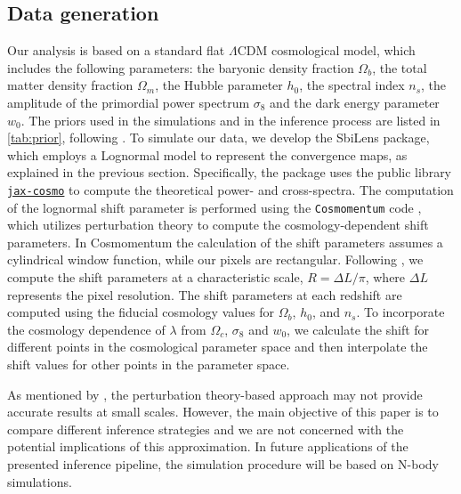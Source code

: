 \documentclass{aa}
\begin{document}
\subsection{Data generation}
Our analysis is based on a standard flat $\Lambda$CDM cosmological model,  which includes the following parameters: the baryonic density fraction $\Omega_b$, the total matter density fraction $\Omega_m$, the Hubble parameter $h_0$, the spectral index $n_s$, the amplitude of the primordial power spectrum $\sigma_8$ and the dark energy parameter $w_0$. The priors used in the simulations and in the inference process are listed in \autoref{tab:prior}, following \citet{zhang2022transitioning}.
To simulate our data, we develop the SbiLens package, which employs a Lognormal model to represent the convergence maps, as explained in the previous section. Specifically, the package uses the public library \href{https://github.com/DifferentiableUniverseInitiative/jax_cosmo}{\texttt{jax-cosmo}} \citep{Campagne_2023} to compute the theoretical power- and cross-spectra. The computation of the lognormal shift parameter is performed using the \texttt{Cosmomentum} code \citep{friedrich2018density, friedrich2020primordial}, which utilizes perturbation theory to compute the cosmology-dependent shift parameters. In Cosmomentum the calculation of the shift parameters assumes a cylindrical window function, while our pixels are rectangular. Following \citet{boruah2022map}, we compute the shift parameters at a characteristic scale, $R=\Delta L/\pi$, where $\Delta L$ represents the pixel resolution. The shift parameters at each redshift are computed using the fiducial cosmology values for $\Omega_b$, $h_0$, and $n_s$. To incorporate the cosmology dependence of $\lambda$ from $\Omega_c$, $\sigma_8$ and $w_0$, we calculate the shift for different points in the cosmological parameter space and then interpolate the shift values for other points in the parameter space.

As mentioned by \citet{boruah2022map}, the perturbation theory-based approach may not provide accurate results at small scales. However, the main objective of this paper is to compare different inference strategies and we are not concerned with the potential implications of this approximation. 
In future applications of the presented inference pipeline, the simulation procedure will be based on N-body simulations.
\end{document}
